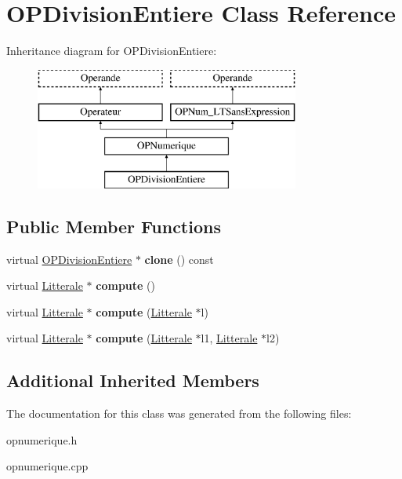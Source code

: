 \hypertarget{class_o_p_division_entiere}{}\section{O\+P\+Division\+Entiere Class Reference}
\label{class_o_p_division_entiere}
Inheritance diagram for O\+P\+Division\+Entiere\+:\begin{figure}[H]
\begin{center}
\leavevmode
\includegraphics[height=4.000000cm]{class_o_p_division_entiere}
\end{center}
\end{figure}
\subsection*{Public Member Functions}
\begin{DoxyCompactItemize}
\item 
virtual \hyperlink{class_o_p_division_entiere}{O\+P\+Division\+Entiere} $\ast$ {\bfseries clone} () const \hypertarget{class_o_p_division_entiere_ae90f3aa4aca15926450391a380de0951}{}\label{class_o_p_division_entiere_ae90f3aa4aca15926450391a380de0951}

\item 
virtual \hyperlink{class_litterale}{Litterale} $\ast$ {\bfseries compute} ()\hypertarget{class_o_p_division_entiere_aeb20c22302666079c2c56eea544a04ce}{}\label{class_o_p_division_entiere_aeb20c22302666079c2c56eea544a04ce}

\item 
virtual \hyperlink{class_litterale}{Litterale} $\ast$ {\bfseries compute} (\hyperlink{class_litterale}{Litterale} $\ast$l)\hypertarget{class_o_p_division_entiere_a23786ead1ed63789b3b94025a1496fb0}{}\label{class_o_p_division_entiere_a23786ead1ed63789b3b94025a1496fb0}

\item 
virtual \hyperlink{class_litterale}{Litterale} $\ast$ {\bfseries compute} (\hyperlink{class_litterale}{Litterale} $\ast$l1, \hyperlink{class_litterale}{Litterale} $\ast$l2)\hypertarget{class_o_p_division_entiere_ad35d7790fe441a7ee109037d4f34d138}{}\label{class_o_p_division_entiere_ad35d7790fe441a7ee109037d4f34d138}

\end{DoxyCompactItemize}
\subsection*{Additional Inherited Members}


The documentation for this class was generated from the following files\+:\begin{DoxyCompactItemize}
\item 
opnumerique.\+h\item 
opnumerique.\+cpp\end{DoxyCompactItemize}
